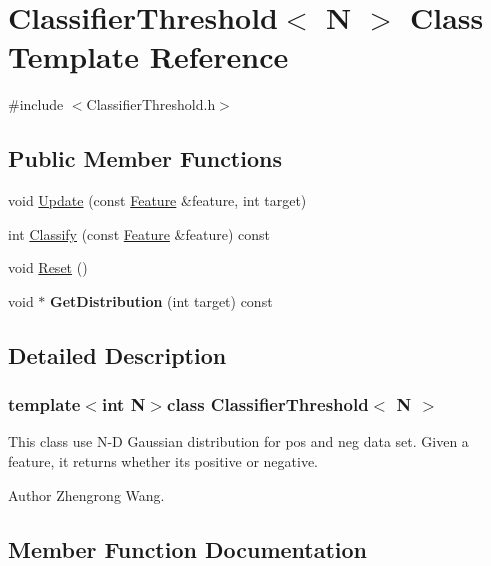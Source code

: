 \hypertarget{classClassifierThreshold}{}\section{Classifier\+Threshold$<$ N $>$ Class Template Reference}
\label{classClassifierThreshold}


{\ttfamily \#include $<$Classifier\+Threshold.\+h$>$}

\subsection*{Public Member Functions}
\begin{DoxyCompactItemize}
\item 
void \hyperlink{classClassifierThreshold_ae9bae753884c08a274b2204af8e97340}{Update} (const \hyperlink{classFeature}{Feature} \&feature, int target)
\item 
int \hyperlink{classClassifierThreshold_a1151b0d98ef528494a75718514b73a38}{Classify} (const \hyperlink{classFeature}{Feature} \&feature) const 
\item 
void \hyperlink{classClassifierThreshold_a1f566cc491d863b15828561cbdfcd7a0}{Reset} ()
\item 
\hypertarget{classClassifierThreshold_ac5ea1576c2b8f51dc2643c7f6dbe7724}{}void $\ast$ {\bfseries Get\+Distribution} (int target) const \label{classClassifierThreshold_ac5ea1576c2b8f51dc2643c7f6dbe7724}

\end{DoxyCompactItemize}


\subsection{Detailed Description}
\subsubsection*{template$<$int N$>$class Classifier\+Threshold$<$ N $>$}

This class use N-\/\+D Gaussian distribution for pos and neg data set. Given a feature, it returns whether it\textquotesingle{}s positive or negative. \begin{DoxyAuthor}{Author}
Zhengrong Wang. 
\end{DoxyAuthor}


\subsection{Member Function Documentation}
\hypertarget{classClassifierThreshold_a1151b0d98ef528494a75718514b73a38}{}
